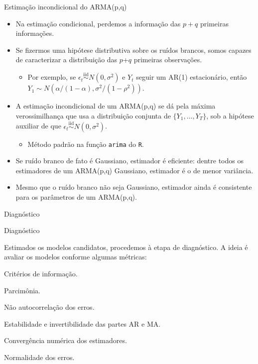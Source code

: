 \documentclass[11pt]{beamer}
\newenvironment{transitionframe}{
	\setbeamercolor{background canvas}{bg=yellow}
	\begin{frame}}{
	\end{frame}
}
\newenvironment{halfwideitemize}{\itemize\addtolength{\itemsep}{0.5em}}{\enditemize}
\newenvironment{halfwideenumerate}{\enumerate\addtolength{\itemsep}{0.5em}}{\endenumerate}
\begin{document}
\begin{frame}{Estimação incondicional do ARMA(p,q)}
	\begin{itemize}
		\item Na estimação condicional, perdemos a informação das $p+q$ primeiras informações.
		\item Se fizermos uma hipótese distributiva sobre os ruídos brancos, somos capazes de caracterizar a distribuição das $p$+$q$ primeiras observações.
		\begin{itemize}
			\item Por exemplo, se $\epsilon_t \overset{\text{iid}}{\sim} N(0,\sigma^2)$ e $Y_t$ seguir um AR(1) estacionário, então $Y_1 \sim N(\alpha/(1-\alpha), \sigma^2/(1-\rho^2))$.
		\end{itemize}
		\item A estimação {\color{blue}incondicional} de um ARMA(p,q) se dá pela máxima verossimilhança que usa a distribuição conjunta de $\{Y_1,\ldots, Y_T\}$, sob a hipótese auxiliar de que  $\epsilon_t \overset{\text{iid}}{\sim} N(0,\sigma^2)$.
		\begin{itemize}
			\item Método padrão na função \texttt{arima} do \texttt{R}.
		\end{itemize}
		\item Se ruído branco de fato é Gaussiano, estimador é {\color{blue}eficiente}: dentre todos os estimadores de um ARMA(p,q) Gaussiano, estimador é o de menor variância.
		\item Mesmo que o ruído branco não seja Gaussiano, estimador ainda é {\color{blue}consistente} para os parâmetros de um ARMA(p,q).
 	\end{itemize}
\end{frame}

\begin{transitionframe}
	\begin{center}
		{\Huge   Diagnóstico}
	\end{center}
\end{transitionframe}


\begin{frame}{Diagnóstico}
	\begin{halfwideitemize}
		\item Estimados os modelos candidatos, procedemos à etapa de diagnóstico. A ideia é avaliar os modelos conforme algumas métricas:
		\begin{halfwideenumerate}
			\item Critérios de informação.
			\item Parcimônia. 
			\item Não autocorrelação dos erros.
			\item Estabilidade e invertibilidade das partes AR e MA.
			\item Convergência numérica dos estimadores.
			\item Normalidade dos erros.
		\end{halfwideenumerate}
	\end{halfwideitemize}
\end{frame}
\end{document}
